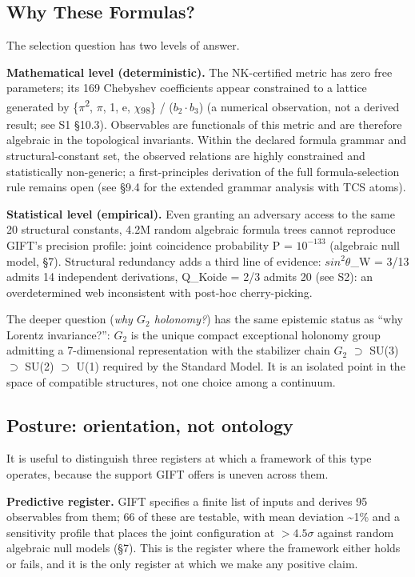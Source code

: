 \documentclass[11pt,a4paper]{article}
\begin{document}
\subsection{Why These Formulas?}

The selection question has two levels of answer.

\textbf{Mathematical level (deterministic).} The NK-certified metric has
zero free parameters; its 169 Chebyshev coefficients appear constrained
to a lattice generated by \{\(\pi\)\textsuperscript{2}, \(\pi\), 1, e,
\(\chi\)\textsubscript{9}\textsubscript{8}\} / (\(b_{2} \cdot b_{3}\))
(a numerical observation, not a derived result; see S1 §10.3).
Observables are functionals of this metric and are therefore algebraic in the topological invariants. Within the declared formula grammar and structural-constant set, the observed relations are highly constrained and statistically non-generic; a first-principles derivation of the full formula-selection rule remains open (see §9.4 for the extended grammar analysis with TCS atoms).

\textbf{Statistical level (empirical).} Even granting an adversary
access to the same 20 structural constants, 4.2M random algebraic
formula trees cannot reproduce GIFT's precision profile: joint
coincidence probability P = \(10^{-133}\) (algebraic null model, §7).
Structural redundancy adds a third line of evidence:
\(sin^{2} \theta\)\_W = 3/13 admits 14 independent derivations, Q\_Koide
= 2/3 admits 20 (see S2): an overdetermined web inconsistent with
post-hoc cherry-picking.

The deeper question (\emph{why \(G_{2}\) holonomy?}) has the same
epistemic status as ``why Lorentz invariance?'': \(G_{2}\) is the unique
compact exceptional holonomy group admitting a 7-dimensional
representation with the stabilizer chain \(G_{2}\) \(\supset\) SU(3)
\(\supset\) SU(2) \(\supset\) U(1) required by the Standard Model. It is
an isolated point in the space of compatible structures, not one choice
among a continuum.

\subsection{Posture: orientation, not ontology}

It is useful to distinguish three registers at which a framework of this
type operates, because the support GIFT offers is uneven across them.

\textbf{Predictive register.} GIFT specifies a finite list of inputs and
derives 95 observables from them; 66 of these are testable, with mean
deviation \textasciitilde1\% and a sensitivity profile that places the
joint configuration at \(> 4.5\sigma\) against random algebraic null
models (§7). This is the register where the framework either holds or
fails, and it is the only register at which we make any positive
claim.
\end{document}
